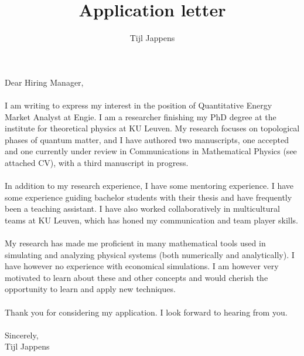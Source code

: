 \documentclass[11pt]{article}
\title{Application letter}
\author{Tijl Jappens}
\begin{document}
\maketitle
Dear Hiring Manager,\\\\
I am writing to express my interest in the position of Quantitative Energy Market Analyst at Engie. I am a researcher finishing my PhD degree at the institute for theoretical physics at KU Leuven. My research focuses on topological phases of quantum matter, and I have authored two manuscripts, one accepted and one currently under review in Communications in Mathematical Physics (see attached CV), with a third manuscript in progress.\\\\
In addition to my research experience, I have some mentoring experience. I have some experience guiding bachelor students with their thesis and have frequently been a teaching assistant. I have also worked collaboratively in multicultural teams at KU Leuven, which has honed my communication and team player skills.\\\\
My research has made me proficient in many mathematical tools used in simulating and analyzing physical systems (both numerically and analytically). I have however no experience with economical simulations. I am however very motivated to learn about these and other concepts and would cherish the opportunity to learn and apply new techniques.
\\\\
Thank you for considering my application. I look forward to hearing from you.\\\\
Sincerely,\\
Tijl Jappens
\end{document}
